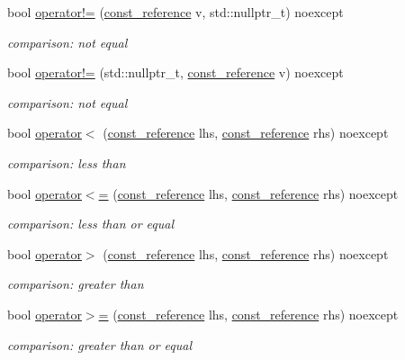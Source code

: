 \begin{DoxyCompactItemize}
bool \hyperlink{a00025_ae347859ec88176ef76a0cbe5b4514fcf}{operator!=} (\hyperlink{a00025_af677a29b0e66edc9f66e5167e4667071}{const\+\_\+reference} v, std\+::nullptr\+\_\+t) noexcept
\begin{DoxyCompactList}\small\item\em comparison\+: not equal \end{DoxyCompactList}\item 
bool \hyperlink{a00025_a7f97a91ad8f1d5cf0b9213bd24f247c4}{operator!=} (std\+::nullptr\+\_\+t, \hyperlink{a00025_af677a29b0e66edc9f66e5167e4667071}{const\+\_\+reference} v) noexcept
\begin{DoxyCompactList}\small\item\em comparison\+: not equal \end{DoxyCompactList}\item 
bool \hyperlink{a00025_aacd442b66140c764c594ac8ad7dfd5b3}{operator$<$} (\hyperlink{a00025_af677a29b0e66edc9f66e5167e4667071}{const\+\_\+reference} lhs, \hyperlink{a00025_af677a29b0e66edc9f66e5167e4667071}{const\+\_\+reference} rhs) noexcept
\begin{DoxyCompactList}\small\item\em comparison\+: less than \end{DoxyCompactList}\item 
bool \hyperlink{a00025_a5c8bb5200f5eac10d31e26be46e5b1ac}{operator$<$=} (\hyperlink{a00025_af677a29b0e66edc9f66e5167e4667071}{const\+\_\+reference} lhs, \hyperlink{a00025_af677a29b0e66edc9f66e5167e4667071}{const\+\_\+reference} rhs) noexcept
\begin{DoxyCompactList}\small\item\em comparison\+: less than or equal \end{DoxyCompactList}\item 
bool \hyperlink{a00025_a87db51b6b936fb2ea293cdbc8702dcb8}{operator$>$} (\hyperlink{a00025_af677a29b0e66edc9f66e5167e4667071}{const\+\_\+reference} lhs, \hyperlink{a00025_af677a29b0e66edc9f66e5167e4667071}{const\+\_\+reference} rhs) noexcept
\begin{DoxyCompactList}\small\item\em comparison\+: greater than \end{DoxyCompactList}\item 
bool \hyperlink{a00025_a74a943800c7f103d0990d7eef82c6453}{operator$>$=} (\hyperlink{a00025_af677a29b0e66edc9f66e5167e4667071}{const\+\_\+reference} lhs, \hyperlink{a00025_af677a29b0e66edc9f66e5167e4667071}{const\+\_\+reference} rhs) noexcept
\begin{DoxyCompactList}\small\item\em comparison\+: greater than or equal \end{DoxyCompactList}\end{DoxyCompactItemize}
